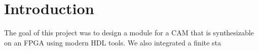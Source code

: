 \section{Introduction}
The goal of this project was to design a module for a CAM that is synthesizable on an FPGA using modern HDL tools. 
We also integrated a finite sta